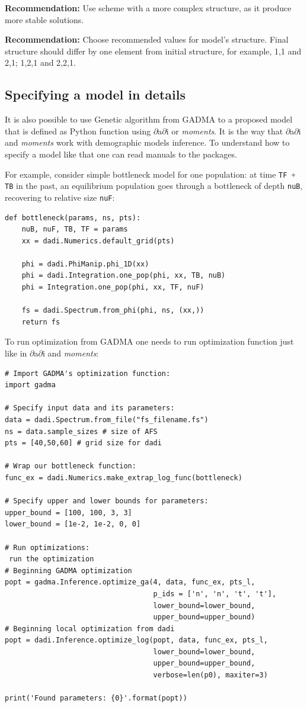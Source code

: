 \documentclass[12pt]{article}
\makeatletter
\newcommand{\dadi}{$\partial$a$\partial$i\xspace}
\newcommand{\moments}{\textit{moments}\xspace}
\newcommand{\py}[1]{\lstinline[language=Python, showstringspaces=False]@#1@}
\makeatother
\begin{document}
\textbf{Recommendation:} Use scheme with a more complex structure, as it produce more stable solutions.

\textbf{Recommendation:} Choose recommended values for model's structure. Final structure should differ by one element from initial structure, for example, 1,1 and 2,1; 1,2,1 and  2,2,1.


\subsection{Specifying a model in details}
\label{sec:spec-model-in-det}

It is also possible to use Genetic algorithm from GADMA to a proposed model that is defined as Python function using \dadi or \moments. It is the way that \dadi and \moments work with demographic models inference. To understand how to specify a model like that one can read manuals to the packages. 

For example, consider simple bottleneck model for one population: at time \py{TF + TB} in the past, an equilibrium population goes through a bottleneck of depth \py{nuB}, recovering to relative size \py{nuF}:

\begin{lstlisting}
def bottleneck(params, ns, pts):
    nuB, nuF, TB, TF = params
    xx = dadi.Numerics.default_grid(pts)
    
    phi = dadi.PhiManip.phi_1D(xx)
    phi = dadi.Integration.one_pop(phi, xx, TB, nuB) 
    phi = Integration.one_pop(phi, xx, TF, nuF)
    
    fs = dadi.Spectrum.from_phi(phi, ns, (xx,)) 
    return fs
\end{lstlisting}

To run optimization from GADMA one needs to run optimization function just like in \dadi and \moments:

\begin{lstlisting}
# Import GADMA's optimization function:
import gadma

# Specify input data and its parameters:
data = dadi.Spectrum.from_file("fs_filename.fs")
ns = data.sample_sizes # size of AFS
pts = [40,50,60] # grid size for dadi

# Wrap our bottleneck function:
func_ex = dadi.Numerics.make_extrap_log_func(bottleneck)

# Specify upper and lower bounds for parameters:
upper_bound = [100, 100, 3, 3]
lower_bound = [1e-2, 1e-2, 0, 0]

# Run optimizations:
 run the optimization 
# Beginning GADMA optimization
popt = gadma.Inference.optimize_ga(4, data, func_ex, pts_l,
                                   p_ids = ['n', 'n', 't', 't'],
                                   lower_bound=lower_bound,
                                   upper_bound=upper_bound)
# Beginning local optimization from dadi
popt = dadi.Inference.optimize_log(popt, data, func_ex, pts_l,
                                   lower_bound=lower_bound,
                                   upper_bound=upper_bound,
                                   verbose=len(p0), maxiter=3)

print('Found parameters: {0}'.format(popt))
\end{lstlisting}
\end{document}
